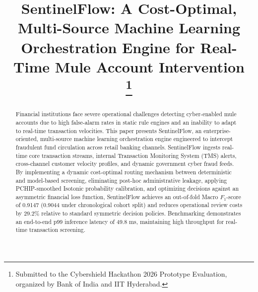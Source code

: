 \documentclass[conference]{IEEEtran}
\begin{document}
\title{SentinelFlow: A Cost-Optimal, Multi-Source Machine Learning Orchestration Engine for Real-Time Mule Account Intervention\\
\thanks{Submitted to the Cybershield Hackathon 2026 Prototype Evaluation, organized by Bank of India and IIT Hyderabad.}
}

\author{
\and
{}
\and
{}
\and
{}
}

\maketitle

\begin{abstract}
Financial institutions face severe operational challenges detecting cyber-enabled mule accounts due to high false-alarm rates in static rule engines and an inability to adapt to real-time transaction velocities. This paper presents SentinelFlow, an enterprise-oriented, multi-source machine learning orchestration engine engineered to intercept fraudulent fund circulation across retail banking channels. SentinelFlow ingests real-time core transaction streams, internal Transaction Monitoring System (TMS) alerts, cross-channel customer velocity profiles, and dynamic government cyber fraud feeds. By implementing a dynamic cost-optimal routing mechanism between deterministic and model-based screening, eliminating post-hoc administrative leakage, applying PCHIP-smoothed Isotonic probability calibration, and optimizing decisions against an asymmetric financial loss function, SentinelFlow achieves an out-of-fold Macro $F_1$-score of 0.9147 (0.9044 under chronological cohort split) and reduces operational review costs by 29.2\% relative to standard symmetric decision policies. Benchmarking demonstrates an end-to-end p99 inference latency of 49.8 ms, maintaining high throughput for real-time transaction screening.
\end{abstract}
\end{document}
